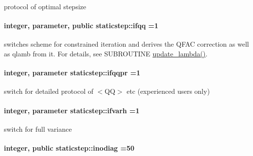 protocol of optimal stepsize 

\paragraph[{\texorpdfstring{ifqq}{ifqq}}]{\setlength{\rightskip}{0pt plus 5cm}integer, parameter, public staticstep\+::ifqq =1}\hypertarget{namespacestaticstep_a5b2a4a8f2936782b9d82c2ef307483a9}{}\label{namespacestaticstep_a5b2a4a8f2936782b9d82c2ef307483a9}


switches scheme for constrained iteration and derives the \textquotesingle{}Q\+F\+AC\textquotesingle{} correction as well as \textquotesingle{}qlamb\textquotesingle{} from it. For details, see S\+U\+B\+R\+O\+U\+T\+I\+NE \textquotesingle{}\hyperlink{namespacestaticstep_a1117ff016ebf0853ab6d064306a22251}{update\+\_\+lambda()}\textquotesingle{}. 

\paragraph[{\texorpdfstring{ifqqpr}{ifqqpr}}]{\setlength{\rightskip}{0pt plus 5cm}integer, parameter staticstep\+::ifqqpr =1\hspace{0.3cm}{\ttfamily [private]}}\hypertarget{namespacestaticstep_a47f36e15f8422ee671acd2861b0aefb3}{}\label{namespacestaticstep_a47f36e15f8422ee671acd2861b0aefb3}


switch for detailed protocol of $<$\+Q\+Q$>$ etc (experienced users only) 

\paragraph[{\texorpdfstring{ifvarh}{ifvarh}}]{\setlength{\rightskip}{0pt plus 5cm}integer, parameter staticstep\+::ifvarh =1\hspace{0.3cm}{\ttfamily [private]}}\hypertarget{namespacestaticstep_afb495985f10f48f0820ffc0a35884c29}{}\label{namespacestaticstep_afb495985f10f48f0820ffc0a35884c29}


switch for full variance 

\paragraph[{\texorpdfstring{inodiag}{inodiag}}]{\setlength{\rightskip}{0pt plus 5cm}integer, public staticstep\+::inodiag =50}\hypertarget{namespacestaticstep_a7c45df3e5b6980084116405e280a9f1e}{}\label{namespacestaticstep_a7c45df3e5b6980084116405e280a9f1e}


